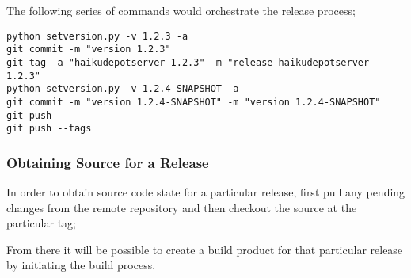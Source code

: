 The following series of commands would orchestrate the release process;

\begin{verbatim}
python setversion.py -v 1.2.3 -a
git commit -m "version 1.2.3"
git tag -a "haikudepotserver-1.2.3" -m "release haikudepotserver-1.2.3"
python setversion.py -v 1.2.4-SNAPSHOT -a
git commit -m "version 1.2.4-SNAPSHOT" -m "version 1.2.4-SNAPSHOT"
git push
git push --tags
\end{verbatim}

\subsubsection{Obtaining Source for a Release}

In order to obtain source code state for a particular release, first pull any pending changes from the remote repository and then checkout the source at the particular tag;


From there it will be possible to create a build product for that particular release by initiating the build process.